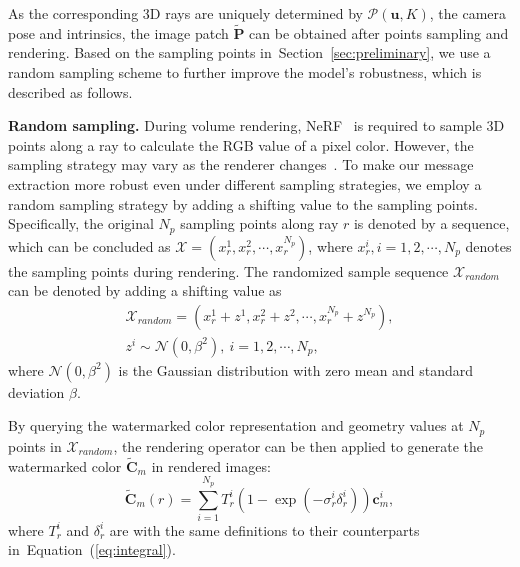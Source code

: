 \documentclass[10pt,twocolumn,letterpaper]{article}
\newcommand{\Eref}[1]{Equation~(\ref{#1})}
\newcommand{\Sref}[1]{Section~\ref{#1}}
\begin{document}

As the corresponding 3D rays are uniquely determined by $\mathcal{P}(\mathbf{u}, K)$, the camera pose and intrinsics, the image patch $\widetilde{\mathbf{P}}$ can be obtained after points sampling and rendering. Based on the sampling points in~\Sref{sec:preliminary}, we use a random sampling scheme to further improve the model's robustness, which is described as follows.

\noindent\textbf{Random sampling.} During volume rendering, NeRF~\cite{nerf2020} is required to sample 3D points along a ray to calculate the RGB value of a pixel color. However, the sampling strategy may vary as the renderer changes~\cite{neff2021donerf, lindell2021autoint}. To make our message extraction more robust even under different sampling strategies, we employ a random sampling strategy by adding a shifting value to the sampling points. Specifically, the original $N_p$ sampling points along ray $r$ is denoted by a sequence, which can be concluded as $\mathcal{X} = (x_r^1, x_r^2, \cdots, x_r^{N_p})$, where $x_r^{i},  i = 1, 2, \cdots, N_p$ denotes the sampling points during rendering. The randomized sample sequence $\mathcal{X}_{random}$ can be denoted by adding a shifting value as
\begin{equation}
\begin{aligned}
\mathcal{X}_{random} = (x_r^1 + z^1, x_r^2 + z^2, \cdots, x_r^{N_p} + z^{N_p}),\\
z^i \sim \mathcal{N}(0, \beta^2),\ i=1,2, \cdots, N_p,
\end{aligned}
\end{equation}
where $\mathcal{N}(0, \beta^2)$ is the Gaussian distribution with zero mean and standard deviation $\beta$.

By querying the watermarked color representation and geometry values at  $N_p$ points in $\mathcal{X}_{random}$, the rendering operator can be then applied to generate the watermarked color $\widetilde{\mathbf{C}}_m$ in rendered images:
\begin{equation}
  \widetilde{\mathbf{C}}_m(r)=\sum_{i=1}^{N_p} T_r^i (1-\exp \left(-\sigma_r^i \delta_r^i\right)) \mathbf{c}_m^i,
\end{equation}
where $T_r^i$ and $\delta_r^i$ are with the same definitions to their counterparts in~\Eref{eq:integral}.
\end{document}
